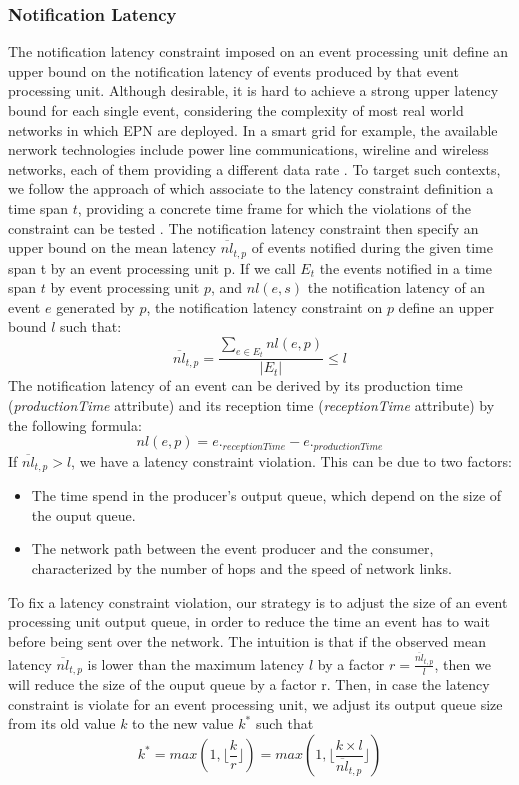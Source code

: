\documentclass[a4paper,twoside]{article}
\begin{document}
\subsubsection{Notification Latency}
The notification latency constraint imposed on an event processing unit define an upper bound on the notification latency of events produced by that event processing unit. Although desirable, it is hard to achieve a strong upper latency bound for each single event, considering the complexity of most real world networks in which EPN are deployed. In a smart grid for example, the available nerwork technologies include power line communications, wireline and wireless networks, each of them providing a different data rate \cite{Wang2011} . To target such contexts, we follow the approach of \cite{Lohrmann2013} which associate to the latency constraint definition a time span $t$, providing a concrete time frame for which the violations of the constraint can be tested . The notification latency constraint then specify an upper bound on the mean latency $\overline{nl}_{t,p}$ of events notified during the given time span t by an event processing unit p. If we call $E_t$ the events notified in a time span $t$  by event processing unit $p$, and $nl(e, s)$ the notification latency of an event $e$ generated by $p$, the notification latency constraint on $p$ define an upper bound $l$ such that:
\begin{equation}\label{eq1}
\overline{nl}_{t,p} = \frac{\sum_{e \in E_t} nl(e,p)}{|E_t|} \leq l
\end{equation} 
The notification latency of an event can be derived by its production time (\textit{productionTime} attribute) and its reception time (\textit{receptionTime} attribute) by the following formula:
\begin{equation}\label{eq2}
nl(e,p) = e._{receptionTime} - e._{productionTime}
\end{equation} 
If $\overline{nl}_{t,p} > l$, we have a latency constraint violation. This can be due to two factors:
\begin{itemize}
\item The time spend in the producer's output queue, which depend on the size of the ouput queue.
\item The network path between the event producer and the consumer, characterized by the number of hops and the speed of network links.
\end{itemize}
To fix a latency constraint violation, our strategy is to adjust the size of an event processing unit output queue, in order to reduce the time an event has to wait before being sent over the network. The intuition is that if the observed mean latency $\overline{nl}_{t,p}$ is lower than the maximum latency $l$ by a factor $r = \frac{\overline{nl}_{t,p}}{l}$, then we will reduce the size of the ouput queue by a factor r. Then, in case the latency constraint is violate for an event processing unit, we adjust its output queue size from its old value $k$ to the new value $k^*$ such that
\begin{equation}\label{eq3} 
 k^* = max(1,\lfloor \frac{k}{r} \rfloor) = max(1, \lfloor \frac{k \times{l}}{\overline{nl}_{t,p}} \rfloor)
 \end{equation}
\end{document}
